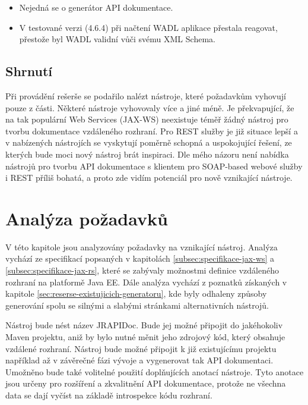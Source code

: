 \documentclass[11pt,twoside,a4paper]{book}
\begin{document}
\begin{itemize}
  \item Nejedná se o generátor API dokumentace.
  \item V testované verzi (4.6.4) při načtení WADL aplikace přestala reagovat, přestože byl
WADL validní vůči svému XML Schema.
\end{itemize}


\subsection{Shrnutí}

Při provádění rešerše se podařilo nalézt nástroje, které požadavkům vyhovují
pouze z části.
Některé nástroje vyhovovaly více a jiné méně. Je překvapující, že na tak
populární Web Services (JAX-WS) neexistuje téměř žádný nástroj pro tvorbu
dokumentace vzdáleného rozhraní. Pro REST služby je již situace lepší a v
nabízených nástrojích se vyskytují poměrně schopná a uspokojující řešení, ze
kterých bude moci nový nástroj brát inspiraci. Dle mého názoru není nabídka
nástrojů pro tvorbu API dokumentace s klientem pro SOAP-based webové služby i
REST příliš bohatá, a proto zde vidím potenciál pro nově vznikající nástroje.

\section{Analýza požadavků}
\label{sec:analyza-pozadavku}

V této kapitole jsou analyzovány požadavky na vznikající nástroj. Analýza vychází ze
specifikací popsaných v kapitolách \ref{subsec:specifikace-jax-ws} a
\ref{subsec:specifikace-jax-rs}, které se zabývaly možnostmi definice vzdáleného rozhraní na platformě Java EE. Dále analýza vychází z poznatků získaných v
kapitole \ref{sec:reserse-existujicich-generatoru}, kde byly odhaleny způsoby
generování spolu se silnými a slabými stránkami alternativních nástrojů.

Nástroj bude nést název JRAPIDoc. Bude jej možné připojit do jakéhokoliv Maven
projektu, aniž by bylo nutné měnit jeho zdrojový kód, který obsahuje vzdálené
rozhraní. Nástroj bude možné připojit k již existujícímu projektu například až v
závěrečné fázi vývoje a vygenerovat tak API dokumentaci. Umožněno bude také
volitelné použití doplňujících anotací nástroje. Tyto anotace jsou určeny pro
rozšíření a zkvalitnění API dokumentace, protože ne všechna data se dají vyčíst
na základě introspekce kódu rozhraní.
\end{document}

